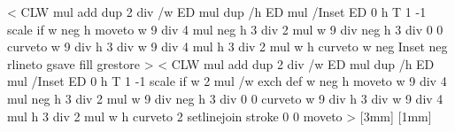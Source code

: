 < %
  CLW mul add dup 
  2 div /w ED 
  mul dup /h ED 
  mul /Inset ED 
  { 0 h T 1 -1 scale } if %
  w neg h moveto %
  w 9 div 4 mul neg h 3 div 2 mul
  w 9 div neg       h 3 div  
  0 0 curveto    %
  w 9 div        h 3 div  
  w 9 div 4 mul  h 3 div 2 mul
  w h curveto %
  w neg Inset neg rlineto %
  gsave 
    \ps@check@tipcolor
  fill grestore >
%
< %
  CLW mul add dup 
  2 div /w ED 
  mul dup /h ED 
  mul /Inset ED 
  { 0 h T 1 -1 scale } if %
  w 2 mul /w exch def
  w neg h moveto %
  w 9 div 4 mul neg h 3 div 2 mul
  w 9 div neg       h 3 div  
  0 0 curveto    %
  w 9 div        h 3 div  
  w 9 div 4 mul  h 3 div 2 mul
  w h curveto %
  2 setlinejoin
    \ps@check@tipcolor
  stroke
  0 0 moveto >
%
%
\newdimen\pshooklength
\newdimen\pshookwidth
{}[3mm]{\pssetlength{}}
[1mm]{\pssetlength{}}
%
\edef\pst@arrowtable{\pst@arrowtable,H-H,h-h} %
\def\tx@RHook{RHook }         %
\def\tx@Rhook{Rhook }         %

